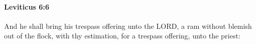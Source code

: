 
		\paragraph{Leviticus 6:6} %
			\label{LEVITICUS-6-6}

			And he shall bring his trespass offering unto the LORD, a ram without blemish out of the flock, with thy estimation, for a trespass offering, unto the priest:


